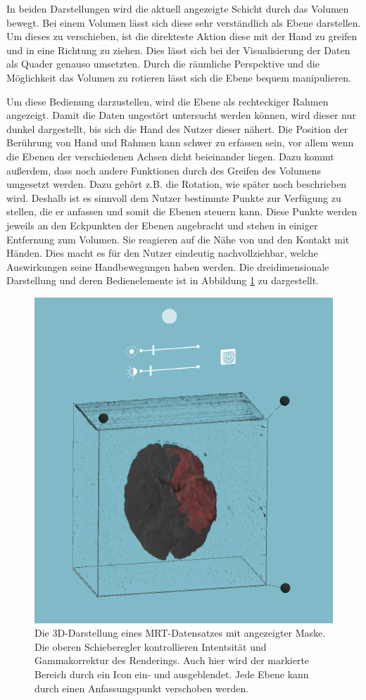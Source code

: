 In beiden Darstellungen wird die aktuell angezeigte Schicht durch das Volumen bewegt. Bei einem Volumen lässt sich diese sehr verständlich als Ebene darstellen. Um dieses zu verschieben, ist die direkteste Aktion diese mit der Hand zu greifen und in eine Richtung zu ziehen. 
Dies lässt sich bei der Visualisierung der Daten als Quader genauso umsetzten. Durch die räumliche Perspektive und die Möglichkeit das Volumen zu rotieren lässt sich die Ebene bequem manipulieren. 

Um diese Bedienung darzustellen, wird die Ebene als rechteckiger Rahmen angezeigt. Damit die Daten ungestört untersucht werden können, wird dieser nur dunkel dargestellt, bis sich die Hand des Nutzer dieser nähert. 
Die Position der Berührung von Hand und Rahmen kann schwer zu erfassen sein, vor allem wenn die Ebenen der verschiedenen Achsen dicht beieinander liegen. Dazu kommt außerdem, dass noch andere Funktionen durch des Greifen des Volumens umgesetzt werden. Dazu gehört z.B. die Rotation, wie später noch beschrieben wird. Deshalb ist es sinnvoll dem Nutzer bestimmte Punkte zur Verfügung zu stellen, die er anfassen und somit die Ebenen steuern kann. Diese Punkte werden jeweils an den Eckpunkten der Ebenen angebracht und stehen in einiger Entfernung zum Volumen. Sie reagieren auf die Nähe von und den Kontakt mit Händen. Dies macht es für den Nutzer eindeutig nachvollziehbar, welche Auswirkungen seine Handbewegungen haben werden. 
Die dreidimensionale Darstellung und deren Bedienelemente ist in Abbildung \ref{img:mARt3d} zu dargestellt.

\begin{figure}[!htb]
	\centering
	\includegraphics[width=0.5\linewidth]{images/mARt3d_2.png}
	\caption{Die 3D-Darstellung eines MRT-Datensatzes mit angezeigter Maske. Die oberen Schieberegler kontrollieren Intentsität und Gammakorrektur des Renderings. Auch hier wird der markierte Bereich durch ein Icon ein- und ausgeblendet. Jede Ebene kann durch einen Anfassungspunkt verschoben werden.}
	\label{img:mARt3d}
\end{figure}
\FloatBarrier

